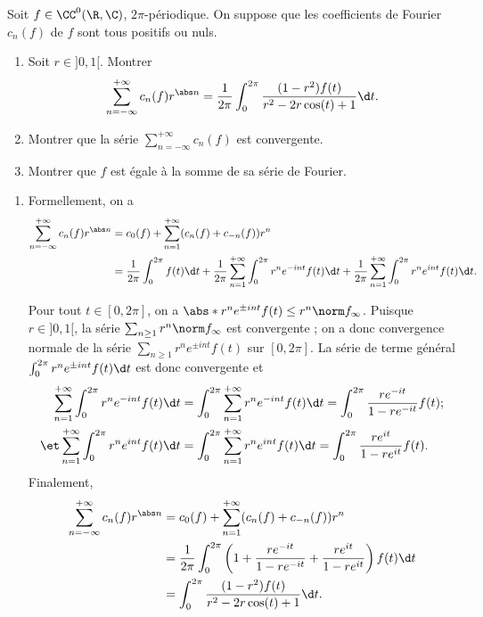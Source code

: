 \begin{enonce}
\begin{exercise}[ID={RMS121/2 E578, Mines-Ponts PSI},subtitle={},tags={}]
Soit $f\in\CC^0(\R,\C)$, $2\pi$-périodique. On suppose que les coefficients de Fourier $c_n(f)$ de $f$ sont tous positifs ou nuls.
\begin{enumerate}
\item Soit $r\in]0,1[$. Montrer
\begin{equation*}
    \sum_{n=-\infty}^{+\infty} c_n(f) r^{\abs n} 
    = \frac1{2\pi}\int_0^{2\pi} \frac{(1-r^2)f(t)}{r^2-2r\cos(t)+1}\d t.
\end{equation*}
\item Montrer que la série $\sum_{n=-\infty}^{+\infty} c_n(f)$ est convergente.
\item Montrer que $f$ est égale à la somme de sa série de Fourier.
\end{enumerate}
\end{exercise}
\begin{solution}
\begin{enumerate}
\item Formellement, on a
\begin{align*}
\sum_{n=-\infty}^{+\infty} c_n(f) r^{\abs n}
&= c_0(f) + \sum_{n=1}^{+\infty} (c_n(f)+c_{-n}(f)) r^n\\
&= \frac1{2\pi}\int_0^{2\pi} f(t)\d t
+\frac1{2\pi}\sum_{n=1}^{+\infty} \int_0^{2\pi} r^n e^{-int}f(t)\d t
+\frac1{2\pi}\sum_{n=1}^{+\infty} \int_0^{2\pi} r^n e^{int}f(t)\d t.
\end{align*}


Pour tout $t\in[0,2\pi]$, on a $\abs*{r^n e^{\pm int} f(t)}\leq r^n\norm f_\infty$.
Puisque $r\in]0,1[$, la série $\sum_{n\geq 1}  r^n\norm f_\infty$ est convergente ;
on a donc convergence normale de la série  $\sum_{n\geq 1} r^n e^{\pm int} f(t)$ sur $[0,2\pi]$.
La série de terme général $\int_0^{2\pi} r^ne^{\pm int}f(t)\d t$ est donc convergente et
\begin{align*}
    \sum_{n=1}^{+\infty} \int_0^{2\pi}r^n e^{-int}f(t)\d t 
    &= 
    \int_0^{2\pi} \sum_{n=1}^{+\infty} r^n e^{-int}f(t)\d t 
    = 
    \int_0^{2\pi}\frac{r e^{-it}}{1-re^{-it}}f(t) ;\\
\et \sum_{n=1}^{+\infty} \int_0^{2\pi}r^n e^{int}f(t)\d t 
    &= 
    \int_0^{2\pi} \sum_{n=1}^{+\infty} r^n e^{int}f(t)\d t 
    = 
    \int_0^{2\pi}\frac{r e^{it}}{1-re^{it}}f(t).
\end{align*}
Finalement,
\begin{align*}
\sum_{n=-\infty}^{+\infty} c_n(f) r^{\abs n}
&= c_0(f) + \sum_{n=1}^{+\infty} (c_n(f)+c_{-n}(f)) r^n\\
&= \frac1{2\pi}\int_0^{2\pi} 
\left( 1+ \frac{r e^{-it}}{1-re^{-it}}+\frac{r e^{it}}{1-re^{it}}\right) 
f(t) \d t\\
&= \int_0^{2\pi} \frac{(1-r^2)f(t)}{r^2-2r\cos(t)+1}\d t.
\end{align*}




\end{enumerate}
\end{solution}
\end{enonce}
